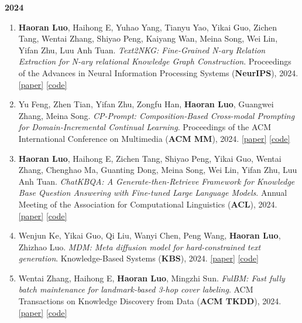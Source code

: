 \documentclass[letterpaper,11pt]{article}
\begin{document}
\vspace{0.5mm}
\textbf{2024}
\begin{enumerate}[resume*=resumeCounter, itemsep=0mm, topsep=2mm, leftmargin=*]
\item \textbf{Haoran Luo}, Haihong E, Yuhao Yang, Tianyu Yao, Yikai Guo, Zichen Tang, Wentai Zhang, Shiyao Peng, Kaiyang Wan, Meina Song, Wei Lin, Yifan Zhu, Luu Anh Tuan. \emph{Text2NKG: Fine-Grained N-ary Relation Extraction for N-ary relational Knowledge Graph Construction}. Proceedings of the Advances in Neural Information Processing Systems (\textbf{NeurIPS}), 2024. \href{https://proceedings.neurips.cc/paper_files/paper/2024/hash/305b2288122d46bf0641bdd86c9a7921-Abstract-Conference.html}{[paper]} \href{https://github.com/LHRLAB/Text2NKG}{[code]}
\item Yu Feng, Zhen Tian, Yifan Zhu, Zongfu Han, \textbf{Haoran Luo}, Guangwei Zhang, Meina Song. \emph{CP-Prompt: Composition-Based Cross-modal Prompting for Domain-Incremental Continual Learning}. Proceedings of the ACM International Conference on Multimedia (\textbf{ACM MM}), 2024. \href{https://dl.acm.org/doi/abs/10.1145/3664647.3681481}{[paper]} \href{https://github.com/dannis97500/CP_Prompt}{[code]}
\item \textbf{Haoran Luo}, Haihong E, Zichen Tang, Shiyao Peng, Yikai Guo, Wentai Zhang, Chenghao Ma, Guanting Dong, Meina Song, Wei Lin, Yifan Zhu, Luu Anh Tuan. \emph{ChatKBQA: A Generate-then-Retrieve Framework for Knowledge Base Question Answering with Fine-tuned Large Language Models}. Annual Meeting of the Association for Computational Linguistics (\textbf{ACL}), 2024. \href{https://aclanthology.org/2024.findings-acl.122/}{[paper]} \href{https://github.com/LHRLAB/ChatKBQA}{[code]}
\item Wenjun Ke, Yikai Guo, Qi Liu, Wanyi Chen, Peng Wang, \textbf{Haoran Luo}, Zhizhao Luo. \emph{MDM: Meta diffusion model for hard-constrained text generation}. Knowledge-Based Systems (\textbf{KBS}), 2024. \href{https://www.sciencedirect.com/science/article/abs/pii/S0950705123008973}{[paper]} \href{https://github.com/seukgcode/MDM}{[code]}
\item Wentai Zhang, Haihong E, \textbf{Haoran Luo}, Mingzhi Sun. \emph{FulBM: Fast fully batch maintenance for landmark-based 3-hop cover labeling}. ACM Transactions on Knowledge Discovery from Data (\textbf{ACM TKDD}), 2024. \href{https://dl.acm.org/doi/abs/10.1145/3650035}{[paper]} \href{https://github.com/ZHANGWENTAI/FulBM}{[code]}
\end{enumerate}
\end{document}
